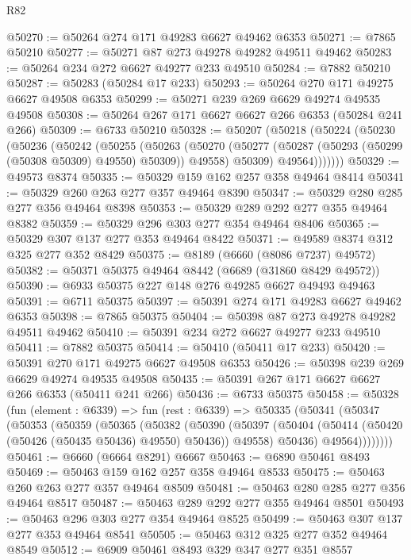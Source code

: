 \begin{lexlean}{R82}
\begin{coremodule}
@50270 := @50264 @274 @171 @49283 @6627 @49462 @6353
@50271 := @7865 @50210
@50277 := @50271 @87 @273 @49278 @49282 @49511 @49462
@50283 := @50264 @234 @272 @6627 @49277 @233 @49510
@50284 := @7882 @50210
@50287 := @50283 (@50284 @17 @233)
@50293 := @50264 @270 @171 @49275 @6627 @49508 @6353
@50299 := @50271 @239 @269 @6629 @49274 @49535 @49508
@50308 := @50264 @267 @171 @6627 @6627 @266 @6353 (@50284 @241 @266)
@50309 := @6733 @50210
@50328 := @50207
    (@50218
      (@50224
        (@50230
          (@50236
            (@50242
              (@50255
                (@50263
                  (@50270
                    (@50277 (@50287 (@50293 (@50299 (@50308 @50309) @49550) @50309)) @49558)
                    @50309)
                  @49564)))))))
@50329 := @49573 @8374
@50335 := @50329 @159 @162 @257 @358 @49464 @8414
@50341 := @50329 @260 @263 @277 @357 @49464 @8390
@50347 := @50329 @280 @285 @277 @356 @49464 @8398
@50353 := @50329 @289 @292 @277 @355 @49464 @8382
@50359 := @50329 @296 @303 @277 @354 @49464 @8406
@50365 := @50329 @307 @137 @277 @353 @49464 @8422
@50371 := @49589 @8374 @312 @325 @277 @352 @8429
@50375 := @8189 (@6660 (@8086 @7237) @49572)
@50382 := @50371 @50375 @49464 @8442 (@6689 (@31860 @8429 @49572))
@50390 := @6933 @50375 @227 @148 @276 @49285 @6627 @49493 @49463
@50391 := @6711 @50375
@50397 := @50391 @274 @171 @49283 @6627 @49462 @6353
@50398 := @7865 @50375
@50404 := @50398 @87 @273 @49278 @49282 @49511 @49462
@50410 := @50391 @234 @272 @6627 @49277 @233 @49510
@50411 := @7882 @50375
@50414 := @50410 (@50411 @17 @233)
@50420 := @50391 @270 @171 @49275 @6627 @49508 @6353
@50426 := @50398 @239 @269 @6629 @49274 @49535 @49508
@50435 := @50391 @267 @171 @6627 @6627 @266 @6353 (@50411 @241 @266)
@50436 := @6733 @50375
@50458 := @50328
    (fun (element : @6339) =>
    fun (rest : @6339) =>
    @50335
      (@50341
        (@50347
          (@50353
            (@50359
              (@50365
                (@50382
                  (@50390
                    (@50397
                      (@50404 (@50414 (@50420 (@50426 (@50435 @50436) @49550) @50436)) @49558)
                      @50436)
                    @49564))))))))
@50461 := @6660 (@6664 @8291) @6667
@50463 := @6890 @50461 @8493
@50469 := @50463 @159 @162 @257 @358 @49464 @8533
@50475 := @50463 @260 @263 @277 @357 @49464 @8509
@50481 := @50463 @280 @285 @277 @356 @49464 @8517
@50487 := @50463 @289 @292 @277 @355 @49464 @8501
@50493 := @50463 @296 @303 @277 @354 @49464 @8525
@50499 := @50463 @307 @137 @277 @353 @49464 @8541
@50505 := @50463 @312 @325 @277 @352 @49464 @8549
@50512 := @6909 @50461 @8493 @329 @347 @277 @351 @8557

\end{coremodule}
\end{lexlean}

